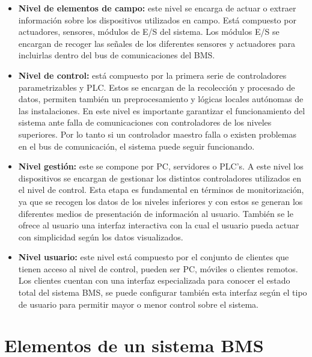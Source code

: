\begin{itemize}
    \item \textbf{Nivel de elementos de campo:} 
    este nivel se encarga de actuar o extraer información sobre los dispositivos utilizados en campo. Está compuesto por actuadores, sensores, módulos de E/S del sistema. Los módulos E/S se encargan de recoger las señales de los diferentes sensores y actuadores para incluirlas dentro del bus de comunicaciones del BMS.
    \item \textbf{Nivel de control:}
     está compuesto por la primera serie de controladores parametrizables y PLC. Estos se encargan de la recolección y procesado de datos, permiten también un preprocesamiento y lógicas locales autónomas de las instalaciones. En este nivel es importante garantizar el funcionamiento del sistema ante falla de comunicaciones con controladores de los niveles superiores. Por lo tanto si un controlador maestro falla o existen problemas en el bus de comunicación, el sistema puede seguir funcionando.
     \item \textbf{Nivel gestión:}
     este se compone por PC, servidores o PLC's. A este nivel los dispositivos se encargan de gestionar los distintos controladores utilizados en el nivel de control. Esta etapa es fundamental en términos de monitorización, ya que se recogen los datos de los niveles inferiores y con estos se generan los diferentes medios de presentación de información al usuario. También se le ofrece al usuario una interfaz interactiva con la cual el usuario pueda actuar con simplicidad según los datos visualizados.
     \item \textbf{Nivel usuario:}
     este nivel está compuesto por el conjunto de clientes que tienen acceso al nivel de control, pueden ser PC, móviles o clientes remotos. Los clientes cuentan con una interfaz especializada para conocer el estado total del sistema BMS, se puede configurar también esta interfaz según el tipo de usuario para permitir mayor o menor control sobre el sistema. 
\end{itemize}

\section{Elementos de un sistema BMS}


